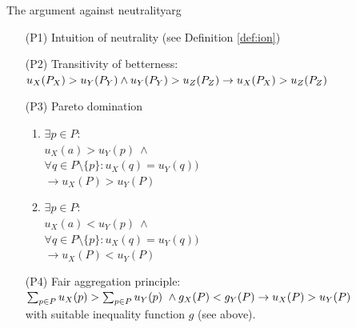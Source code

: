 \begin{Theorem}{The argument against neutrality}{arg}
\begin{enumerate}
\item[(P1)] Intuition of neutrality (see Definition \ref{def:ion})
\item[(P2)] Transitivity of betterness: \\
  $
    u_X(P_X) > u_Y(P_Y) \wedge u_Y(P_Y) > u_Z(P_Z) \\
    \rightarrow
    u_X(P_X) > u_Z(P_Z)
  $
\item[(P3)] Pareto domination
  \begin{enumerate}
  \item
    $
      \exists p \in P:
    $ \\
    \hspace{1cm} $
      u_X(a) > u_Y(p) \ \wedge
    $ \\
    \hspace{1cm} $
      \forall q \in P \setminus \{p\}: u_X(q) = u_Y(q) )
    $ \\
    \hspace{.5cm} $
      \rightarrow
      u_X(P) > u_Y(P) 
    $
  \item
    $
      \exists p \in P:
    $ \\
    \hspace{1cm} $
      u_X(a) < u_Y(p) \ \wedge
    $ \\
    \hspace{1cm} $
      \forall q \in P \setminus \{p\}: u_X(q) = u_Y(q) )
    $ \\
    \hspace{.5cm} $
      \rightarrow
      u_X(P) < u_Y(P) 
    $
  \end{enumerate}
\item[(P4)] Fair aggregation principle: \\
  $
    \sum_{p\in P} u_X(p) > \sum_{p\in P} u_Y(p) \ \wedge \\
    g_X(P) < g_Y(P) \\
    \rightarrow u_X(P) > u_Y(P)
  $ \\
  with suitable inequality function $g$ (see above).
\end{enumerate}

\end{Theorem}

